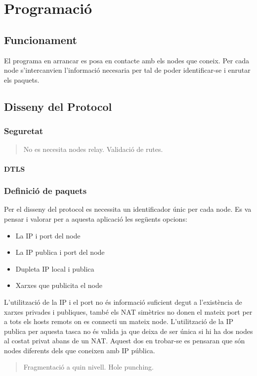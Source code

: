 \chapter{Programació}
\section{Funcionament}
El programa en arrancar es posa en contacte amb els nodes que coneix. Per cada node s'intercanvien l'informació necesaria per tal de poder identificar-se i enrutar els paquets.
\section{Disseny del Protocol}
\subsection{Seguretat}
\begin{quote}
No es necesita nodes relay.
Validació de rutes.
\end{quote}
\subsubsection{DTLS}

\subsection{Definició de paquets}
Per el disseny del protocol es necessita un identificador únic per cada node. Es va pensar i valorar per a aquesta aplicació les següents opcions:
\begin{itemize}
\item La IP i port del node
\item La IP publica i port del node
\item Dupleta IP local i publica
\item Xarxes que publicita el node
\end{itemize}
L'utilització de la IP i el port no és informació suficient degut a l'existència de xarxes privades i publiques, també els NAT simètrics no donen el mateix port per a tots els hosts remots on es connecti un mateix node.
L'utilització de la IP publica per aquesta tasca no és valida ja que deixa de ser única si hi ha dos nodes al costat privat abans de un NAT. Aquest dos en trobar-se es pensaran que són nodes diferents dels que coneixen amb IP pública.

\begin{quote}
Fragmentació a quin nivell.
Hole punching.
\end{quote}

